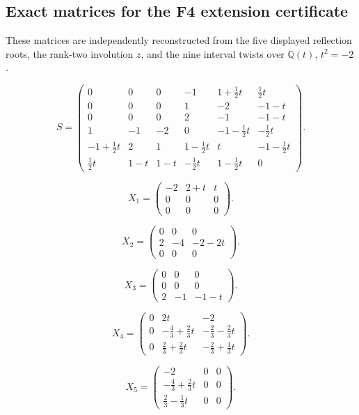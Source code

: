 \subsection*{Exact matrices for the F4 extension certificate}

These matrices are independently reconstructed from the five displayed reflection roots, the rank-two involution $z$, and the nine interval twists over $\mathbb Q(t)$, $t^2=-2$.

\[S=\begin{pmatrix}
0 & 0 & 0 & -1 & 1+\frac{1}{2}t & \frac{1}{2}t \\
0 & 0 & 0 & 1 & -2 & -1-t \\
0 & 0 & 0 & 2 & -1 & -1-t \\
1 & -1 & -2 & 0 & -1-\frac{1}{2}t & -\frac{1}{2}t \\
-1+\frac{1}{2}t & 2 & 1 & 1-\frac{1}{2}t & t & -1-\frac{1}{2}t \\
\frac{1}{2}t & 1-t & 1-t & -\frac{1}{2}t & 1-\frac{1}{2}t & 0
\end{pmatrix}.\]

\[X_{1}=\begin{pmatrix}
-2 & 2+t & t \\
0 & 0 & 0 \\
0 & 0 & 0
\end{pmatrix}.\]

\[X_{2}=\begin{pmatrix}
0 & 0 & 0 \\
2 & -4 & -2-2t \\
0 & 0 & 0
\end{pmatrix}.\]

\[X_{3}=\begin{pmatrix}
0 & 0 & 0 \\
0 & 0 & 0 \\
2 & -1 & -1-t
\end{pmatrix}.\]

\[X_{4}=\begin{pmatrix}
0 & 2t & -2 \\
0 & -\frac{4}{3}+\frac{2}{3}t & -\frac{2}{3}-\frac{2}{3}t \\
0 & \frac{2}{3}+\frac{2}{3}t & -\frac{2}{3}+\frac{1}{3}t
\end{pmatrix}.\]

\[X_{5}=\begin{pmatrix}
-2 & 0 & 0 \\
-\frac{4}{3}+\frac{2}{3}t & 0 & 0 \\
\frac{2}{3}-\frac{1}{3}t & 0 & 0
\end{pmatrix}.\]

